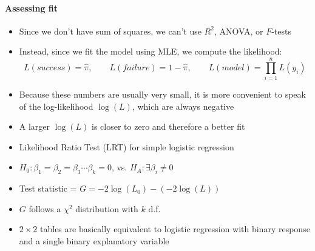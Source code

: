 \documentclass[10pt]{article}\usepackage[]{graphicx}\usepackage[]{color}
\begin{document}
\paragraph{Assessing fit}
\begin{itemize}
		\item Since we don't have sum of squares, we can't use $R^2$, ANOVA, or $F$-tests
		\item Instead, since we fit the model using MLE, we compute the likelihood:
		$$
			L(success) = \hat{\pi}, \qquad L(failure) = 1-\hat{\pi}, \qquad L(model) = \prod_{i=1}^n L(y_i)
		$$
		\item Because these numbers are usually very small, it is more convenient to speak of the log-likelihood $\log(L)$, which are always negative 
		\item A larger $\log(L)$ is closer to zero and therefore a better fit

		\item Likelihood Ratio Test (LRT) for simple logistic regression
		\item $H_0: \beta_1= \beta_2 = \beta_3 \cdots \beta_k = 0$, vs. $H_A: \exists \beta_i \neq 0$
		\item Test statistic = $G = -2 \log(L_0) - (-2 \log(L))$
		\item $G$ follows a $\chi^2$ distribution with $k$ d.f.
		\item $2 \times 2$ tables are basically equivalent to logistic regression with binary response and a single binary explanatory variable
	\end{itemize}
\end{document}
